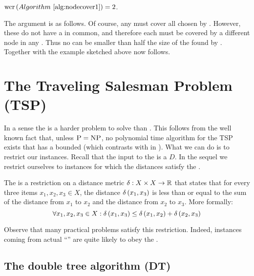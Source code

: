 \begin{theorem}
$\funm{wcr}{\algoref{nodecover1}}=2$.
\end{theorem}

The argument is as follows. Of course, any  must cover all  chosen by . However, these  do not have a  in common, and therefore each  must be covered by a different node in any . Thus no  can be smaller than half the size of the  found by . Together with the example sketched above  now follows.

\section{The Traveling Salesman Problem (TSP)}
In a sense the  is a harder problem to solve than . This follows from the well known fact that, unless $\mbox{\textsc{P}}=\mbox{\textsc{NP}}$, no polynomial time algorithm for the TSP exists that has a bounded  (which contrasts with  in ). What we can do is to restrict our instances. Recall that the input to the  is a  $D$. In the sequel we restrict ourselves to instances for which the distances satisfy the .

\begin{definition}
The  is a restriction on a distance metric $\delta:X\times X\rightarrow\mathbb{R}$ that states that for every three items $x_1,x_2,x_3\in X$, the distance $\delta\left( x_1,x_3 \right)$ is less than or equal to the sum of the distance from $x_1$ to $x_2$ and the distance from $x_2$ to $x_3$. More formally:
\begin{equation}
\forall x_1,x_2,x_3\in X:\delta\left( x_1,x_3 \right)\leq\delta\left( x_1,x_2 \right)+\delta\left( x_2,x_3 \right)
\end{equation}
\end{definition}

Observe that many practical problems satisfy this restriction. Indeed,  instances coming from actual ``'' are quite likely to obey the .

\subsection{The double tree algorithm (DT)}

